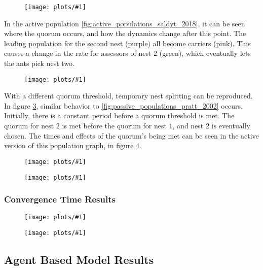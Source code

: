 \documentclass{article}
\newcommand{\plot}[3]{
    \begin{figure}[h]
        \texttt{[image: plots/\#1]}
        \caption{#2}
        \label{fig:#1}
    \end{figure}
}
\begin{document}
\plot{passive_populations_saldyt_2018_alt}{}{0.5}

In the active population \ref{fig:active_populations_saldyt_2018}, it can be seen where the quorum occurs, and how the dynamics change after this point. 
The leading population for the second nest (purple) all become carriers (pink).
This causes a change in the rate for assessors of nest $2$ (green), which eventually lets the ants pick nest two.

\plot{active_populations_saldyt_2018_alt}{}{0.5}

With a different quorum threshold, temporary nest splitting can be reproduced.
In figure \ref{fig:passive_populations_saldyt_2018_alt_low_T}, similar behavior to \ref{fig:passive_populations_pratt_2002} occurs. 
Initially, there is a constant period before a quorum threshold is met.
The quorum for nest $2$ is met before the quorum for nest $1$, and nest $2$ is eventually chosen.
The times and effects of the quorum's being met can be seen in the active version of this population graph, in figure \ref{fig:active_populations_saldyt_2018_alt_low_T}.

\plot{passive_populations_saldyt_2018_alt_low_T}{}{0.5}
\plot{active_populations_saldyt_2018_alt_low_T}{}{0.5}

\subsubsection{Convergence Time Results}

\plot{quality_ode_convergence_times}{}{0.5}
\plot{distance_ode_convergence_times}{}{0.5}

\subsection{Agent Based Model Results}

% 
% 
% 
% 
\end{document}
